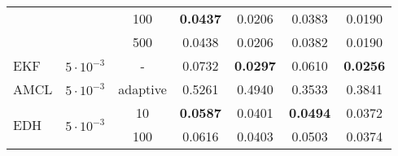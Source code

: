 \begin{table}[]
\begin{tabular}{lllllll}
        \multicolumn{1}{|l|}{}                           & \multicolumn{1}{c|}{}                                           & \multicolumn{1}{c|}{100}                                        & \multicolumn{1}{c|}{\textbf{0.0437}}           & \multicolumn{1}{c|}{0.0206}                    & \multicolumn{1}{c|}{0.0383}                    & \multicolumn{1}{c|}{0.0190}                     \\ \cline{3-7}
        \multicolumn{1}{|l|}{}                           & \multicolumn{1}{c|}{}                                           & \multicolumn{1}{c|}{500}                                        & \multicolumn{1}{c|}{0.0438}                    & \multicolumn{1}{c|}{0.0206}                    & \multicolumn{1}{c|}{0.0382}                    & \multicolumn{1}{c|}{0.0190}                     \\ \hline
        \hline
        \multicolumn{1}{|l|}{EKF}                        & \multicolumn{1}{c|}{$5\cdot10^{-3}$}                            & \multicolumn{1}{c|}{-}                                          & \multicolumn{1}{c|}{0.0732}                    & \multicolumn{1}{c|}{\textbf{0.0297}}           & \multicolumn{1}{c|}{0.0610}                    & \multicolumn{1}{c|}{\textbf{0.0256}}            \\ \hline
        \multicolumn{1}{|l|}{AMCL}                       & \multicolumn{1}{c|}{$5\cdot10^{-3}$}                            & \multicolumn{1}{c|}{adaptive}                                   & \multicolumn{1}{c|}{0.5261}                    & \multicolumn{1}{c|}{0.4940}                    & \multicolumn{1}{c|}{0.3533}                    & \multicolumn{1}{c|}{0.3841}                     \\ \hline
        \multicolumn{1}{|l|}{\multirow{3}{*}{EDH}}       & \multicolumn{1}{c|}{\multirow{3}{*}{$5\cdot10^{-3}$}}           & \multicolumn{1}{c|}{10}                                         & \multicolumn{1}{c|}{\textbf{0.0587}}           & \multicolumn{1}{c|}{0.0401}                    & \multicolumn{1}{c|}{\textbf{0.0494}}           & \multicolumn{1}{c|}{0.0372}                     \\ \cline{3-7}
        \multicolumn{1}{|l|}{}                           & \multicolumn{1}{c|}{}                                           & \multicolumn{1}{c|}{100}                                        & \multicolumn{1}{c|}{0.0616}                    & \multicolumn{1}{c|}{0.0403}                    & \multicolumn{1}{c|}{0.0503}                    & \multicolumn{1}{c|}{0.0374}                     \\ \cline{3-7}

\end{tabular}
\end{table}
